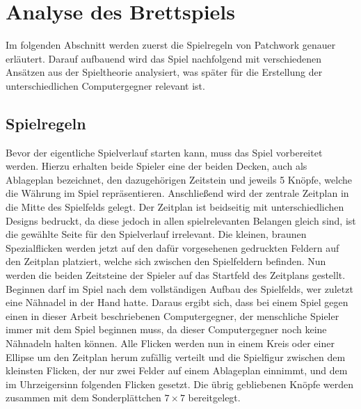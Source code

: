 
\chapter{Analyse des Brettspiels}
\label{chapter:analyse-des-bretspiels}

Im folgenden Abschnitt werden zuerst die Spielregeln von Patchwork genauer erläutert. Darauf aufbauend wird das Spiel nachfolgend mit verschiedenen Ansätzen aus der Spieltheorie analysiert, was später für die Erstellung der unterschiedlichen Computergegner relevant ist.

\section{Spielregeln}
\label{section:spielregeln}


Bevor der eigentliche Spielverlauf starten kann, muss das Spiel vorbereitet werden. Hierzu erhalten beide Spieler eine der beiden Decken, auch als Ablageplan bezeichnet, den dazugehörigen Zeitstein und jeweils 5 Knöpfe, welche die Währung im Spiel repräsentieren. Anschließend wird der zentrale Zeitplan in die Mitte des Spielfelds gelegt. Der Zeitplan ist beidseitig mit unterschiedlichen Designs bedruckt, da diese jedoch in allen spielrelevanten Belangen gleich sind, ist die gewählte Seite für den Spielverlauf irrelevant. Die kleinen, braunen Spezialflicken werden jetzt auf den dafür vorgesehenen gedruckten Feldern auf den Zeitplan platziert, welche sich zwischen den Spielfeldern befinden. Nun werden die beiden Zeitsteine der Spieler auf das Startfeld des Zeitplans gestellt. Beginnen darf im Spiel nach dem vollständigen Aufbau des Spielfelds, wer zuletzt eine Nähnadel in der Hand hatte. Daraus ergibt sich, dass bei einem Spiel gegen einen in dieser Arbeit beschriebenen Computergegner, der menschliche Spieler immer mit dem Spiel beginnen muss, da dieser Computergegner noch keine Nähnadeln halten können. Alle Flicken werden nun in einem Kreis oder einer Ellipse um den Zeitplan herum zufällig verteilt und die Spielfigur zwischen dem kleinsten Flicken, der nur zwei Felder auf einem Ablageplan einnimmt, und dem im Uhrzeigersinn folgenden Flicken gesetzt. Die übrig gebliebenen Knöpfe werden zusammen mit dem Sonderplättchen $7\times7$ bereitgelegt. \cite{2014.PatchworkSpielanleitung}

